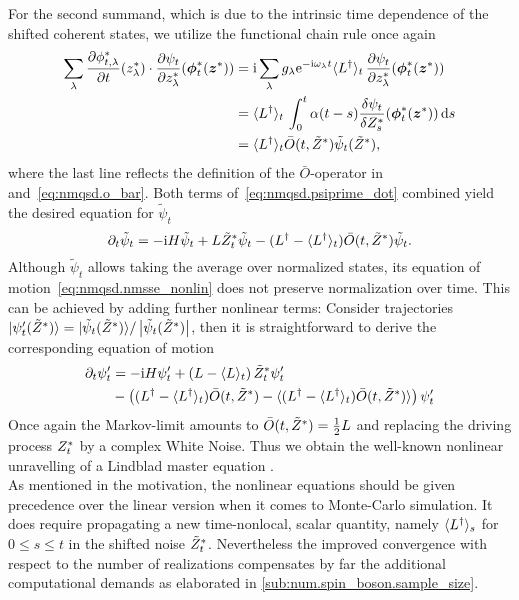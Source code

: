 For the second summand, which is due to the intrinsic time dependence of the shifted coherent states, we utilize the functional chain rule once again
\begin{align*}
  \sum_\lambda \frac{\partial\ccphitla}{\partial t}(\cc z_\lambda) \cdot \frac{\partial\psi_t}{\partial \cc z_\lambda} (\cc{\vec\phi}_t(\cc\zz))
  &= \ii \sum_\lambda g_\lambda \exp[-\ii \omega_\lambda t] \qmean{\adj L}_t \, \frac{\partial\psi_t}{\partial \cc z_\lambda} (\cc{\vec\phi}_t(\cc\zz)) \\
  &= \qmean{\adj L}_t \, \int_0^t \alpha(t - s) \frac{\delta \psi_t}{\delta \ZZ_s} (\cc{\vec\phi}_t(\cc\zz)) \dd s \\
  &= \qmean{\adj L}_t \bar O(t, \tildeZZ) \tilde\psi_t(\tildeZZ),
\end{align*}
where the last line reflects the definition of the $\bar O$-operator in  and~\ref{eq:nmqsd.o_bar}.
Both terms of~\ref{eq:nmqsd.psiprime_dot} combined yield the desired equation for $\tilde\psi_t$
\begin{equation}
  \partial_t \tilde\psi_t = -\mathrm{i}H \tilde\psi_t + L{\tilde Z}^*_t\tilde\psi_t - (L^\dagger - \langle L^\dagger \rangle_t) \bar O(t, {\tilde Z}^*) \tilde\psi_t.
  \label{eq:nmqsd.nmsse_nonlin}
\end{equation}
Although $\tilde\psi_t$ allows taking the average over normalized states, its equation of motion~\ref{eq:nmqsd.nmsse_nonlin} does not preserve normalization over time.
This can be achieved by adding further nonlinear terms:
Consider trajectories $| \psi'_t({\tilde Z}^*) \rangle = | \tilde\psi_t({\tilde Z}^*) \rangle / \left\vert \tilde\psi_t({\tilde Z}^*) \right\vert$, then it is straightforward to derive the corresponding equation of motion \cite{DiGiSt98_nmqsd}
\begin{align}
  \partial_t\psi'_t &= -\mathrm{i}H\psi'_t  +  \left(L - \langle L \rangle_t\right) {\tilde Z}^*_t\psi'_t  \nonumber \\
  &-  \left( (L^\dagger - \langle L^\dagger \rangle_t) \bar O(t, {\tilde Z}^*) - \langle (L^\dagger - \langle L^\dagger \rangle_t) \bar O(t, {\tilde Z}^*) \rangle \right) \psi'_t
  \label{eq:nmqsd.nmsse_nonlin_full}
\end{align}
Once again the Markov-limit amounts to $\bar O(t, {\tilde Z}^*) = \frac{1}{2} L$ and replacing the driving process ${Z}^*_t$ by a complex White Noise.
Thus we obtain the well-known nonlinear unravelling of a Lindblad master equation \cite{BaGr09_trajectories}.\\



As mentioned in the motivation, the nonlinear equations should be given precedence over the linear version when it comes to Monte-Carlo simulation.
It does require propagating a new time-nonlocal, scalar quantity, namely $\langle L^\dagger \rangle_s$ for $0 \le s \le t$ in the shifted noise ${\tilde Z}^*_t$.
Nevertheless the improved convergence with respect to the number of realizations compensates by far the additional computational demands as elaborated in \autoref{sub:num.spin_boson.sample_size}.

